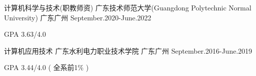 

\begin{cventries}

  \cventry
    {计算机科学与技术(职教师资)} %
    {广东技术师范大学(Guangdong Polytechnic Normal University)} %
    {广东广州} %
    {September.2020-June.2022} %
    {
      \begin{cvitems} %
      \item {GPA 3.63/4.0}
      \end{cvitems}
    }

  \cventry
    {计算机应用技术} %
    {广东水利电力职业技术学院} %
    {广东广州} %
    {September.2016-June.2019} %
    {
      \begin{cvitems} %
        \item {GPA 3.44/4.0 ( 全系前1\% )}
      \end{cvitems}
      }

    

\end{cventries}
